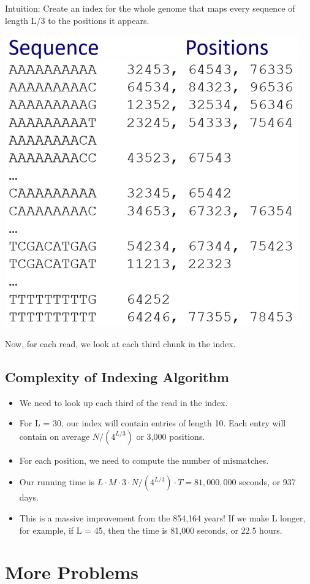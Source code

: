 \documentclass[10pt]{article}
\begin{document}
\noindent Intuition: Create an index for the whole genome that maps every sequence of length L/3 to the positions it appears.
\begin{center}
    \includegraphics*[scale=0.5]{W1_3.png}
\end{center}
Now, for each read, we look at each third chunk in the index.
\subsection*{Complexity of Indexing Algorithm}
\begin{itemize}
    \item We need to look up each third of the read in the index.
    \item For L = 30, our index will contain entries of length 10.  Each entry will contain on average $N / (4^{L / 3})$ or 3,000 positions.
    \item For each position, we need to compute the number of mismatches.
    \item Our running time is $L \cdot M \cdot 3 \cdot N / (4^{L / 3}) \cdot T = 81,000,000$ seconds, or 937 days.
    \item This is a massive improvement from the 854,164 years!  If we make L longer, for example, if L = 45, then the time is 81,000 seconds, or 22.5 hours.
\end{itemize}
\section*{More Problems}
\end{document}
